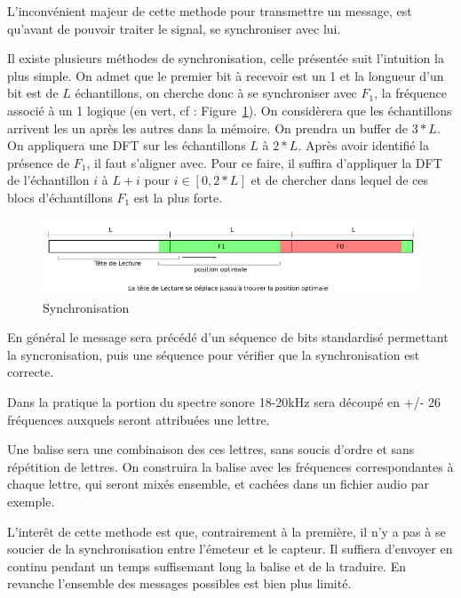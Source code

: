 \documentclass[12pt]{article}
\begin{document}
L'inconvénient majeur de cette methode pour transmettre un message, est qu'avant de pouvoir traiter le signal, se synchroniser avec lui.

Il existe plusieurs méthodes de synchronisation, celle présentée suit l'intuition la plus simple. On admet que le premier bit à recevoir est un 1 et la longueur d'un bit est de $L$ échantillons, on cherche donc à se synchroniser avec $F_1$, la fréquence associé à un 1 logique (en vert, cf : Figure~\ref{fig:syncro}).
On considèrera que les échantillons arrivent les un après les autres dans la mémoire. On prendra un buffer de $3*L$. On appliquera une DFT sur les échantillons $L$ à $2*L$. Après avoir identifié la présence de $F_1$, il faut s'aligner avec. Pour ce faire, il suffira d'appliquer la DFT de l'échantillon $i$ à $L+i$ pour $i \in [0,2*L]$ et de chercher dans lequel de ces blocs d'échantillons $F_1$ est la plus forte.

\begin{figure}[H]
\begin{center}
\caption{Synchronisation}
\label{fig:syncro}
\includegraphics[scale=0.8]{syncro.png}
\end{center}
\end{figure}

En général le message sera précédé d'un séquence de bits standardisé permettant la syncronisation, puis une séquence pour vérifier que la synchronisation est correcte.

Dans la pratique la portion du spectre sonore 18-20kHz sera découpé en +/- 26 fréquences auxquels seront attribuées une lettre.

Une balise sera une combinaison des ces lettres, sans soucis d'ordre et sans répétition de lettres. On construira la balise avec les fréquences correspondantes à chaque lettre, qui seront mixés ensemble, et cachées dans un fichier audio par exemple.

L'interêt de cette methode est que, contrairement à la première, il n'y a pas à se soucier de la synchronisation entre l'émeteur et le capteur. Il suffiera d'envoyer en continu pendant un temps suffisemant long la balise et de la traduire. En revanche l'ensemble des messages possibles est bien plus limité.
\end{document}
